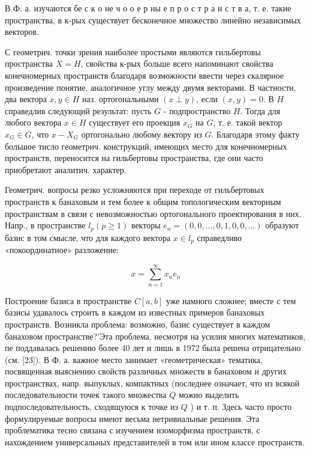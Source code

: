 \documentclass[10pt]{article}
\begin{document}
В Ф. а. изучаются бе с к о не ч о о е р ны е п р о с т р а н с т в а, т. е. такие пространства, в к-рых существует бесконечное множество линейно независимых векторов.



С геометрич. точки зрения наиболее простыми являются гильбертовы пространства $X=H$, свойства к-рых больше всего напоминают свойства конечномерных пространств благодаря возможности ввести через скалярное произведение понятие, аналогичное углу между двумя векторами. В частности, два вектора $x, y \in H$ наз. ортогональными $(x \perp y)$, если $(x, y)=0$. В $H$ справедлив следующий результат: пусть $G$ - подпространство $H$. Тогда для любого вектора $x \in H$ существует его проекция $x_{G}$ на $G$, т. е. такой вектор $x_{G} \in G$, что $x-X_{G}$ ортогонально любому вектору из $G$. Благодаря этому факту большое тисло геометрич. конструкций, имеющих место для конечномерных пространств, переносится на гильбертовы пространства, где они часто приобретают аналитич. характер.



Геометрич. вопросы резко усложняются при переходе от гильбертовых пространств к банаховым и тем более к общим топологическим векторным пространствам в связи с невозможностью ортогонального проектирования в них. Напр., в пространстве $l_{p}(p \geqslant 1)$ векторы $e_{n}=(0,0, \ldots, 0,1,0,0, \ldots)$ образуют базис в том смысле, что для каждого вектора $x \in l_{p}$ справедливо «покоординатное» разложение:



\[

x=\sum_{n=1}^{\infty} x_{n} e_{n}

\]



Построение базиса в пространстве $C[a, b]$ уже намного сложнее; вместе с тем базисы удавалось строить в каждом из известных примеров банаховых пространств. Возникла проблема: возможно, базис существует в каждом банаховом пространстве?'Эта проблема, несмотря на усилия многих математиков, пе поддавалась решению более 40 лет и лишь в 1972 была решена отрицательно (см. [23]). В Ф. а. важное место занимает «геометрическая» тематика, посвященная выяснению свойств различных множеств в банаховом и других пространствах, напр. выпуклых, компактных (последнее означает, что из всякой последовательности точек такого множества $Q$ можно выделить подпоследовательность, сходящуюся к точке из $Q$ ) и т. п. Здесь часто просто формулируемые вопросы имеют весьма нетривиальные решения. Эта проблематика тесно связана с изучением изоморфизма пространств, с нахождением универсальных представителей в том или ином классе пространств.
\end{document}
